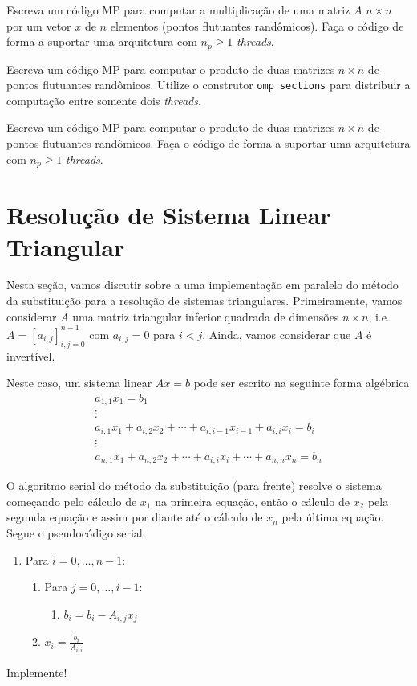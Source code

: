 \begin{exer}\label{exer:cc_Ax}
  Escreva um código MP para computar a multiplicação de uma matriz $A$ $n\times n$ por um vetor $x$ de $n$ elementos (pontos flutuantes randômicos). Faça o código de forma a suportar uma arquitetura com $n_p \geq 1$ {\it threads}. 
\end{exer}

\begin{exer}
  Escreva um código MP para computar o produto de duas matrizes $n\times n$ de pontos flutuantes randômicos. Utilize o construtor \verb+omp sections+ para distribuir a computação entre somente dois {\it threads}. 
\end{exer}

\begin{exer}
  Escreva um código MP para computar o produto de duas matrizes $n\times n$ de pontos flutuantes randômicos. Faça o código de forma a suportar uma arquitetura com $n_p \geq 1$ {\it threads}.
\end{exer}

\section{Resolução de Sistema Linear Triangular}\label{cap_mp_sec_sistria}

Nesta seção, vamos discutir sobre a uma implementação em paralelo do método da substituição para a resolução de sistemas triangulares. Primeiramente, vamos considerar $A$ uma matriz triangular inferior quadrada de dimensões $n\times n$, i.e. $A=[a_{i,j}]_{i,j=0}^{n-1}$ com $a_{i,j}=0$ para $i<j$. Ainda, vamos considerar que $A$ é invertível.

Neste caso, um sistema linear $Ax = b$ pode ser escrito na seguinte forma algébrica
\begin{gather}
  a_{1,1}x_1 = b_1\\
             \vdots \\
  a_{i,1}x_1 + a_{i,2}x_2 + \cdots + a_{i,i-1}x_{i-1} + a_{i,i}x_{i} = b_i \\
             \vdots\\
  a_{n,1}x_1 + a_{n,2}x_2 + \cdots + a_{i,i}x_i + \cdots + a_{n,n}x_{n} = b_n               
\end{gather}

O algoritmo serial do método da substituição (para frente) resolve o sistema começando pelo cálculo de $x_1$ na primeira equação, então o cálculo de $x_2$ pela segunda equação e assim por diante até o cálculo de $x_n$ pela última equação. Segue o pseudocódigo serial.
\begin{enumerate}
\item Para $i = 0, \dotsc, n-1$:
  \begin{enumerate}
  \item Para $j = 0, \dotsc, i-1$:
    \begin{enumerate}
    \item $b_i = b_i - A_{i,j}x_j$
    \end{enumerate}
  \item $\displaystyle x_i = \frac{b_i}{A_{i,i}}$
  \end{enumerate}
\end{enumerate}
Implemente!

